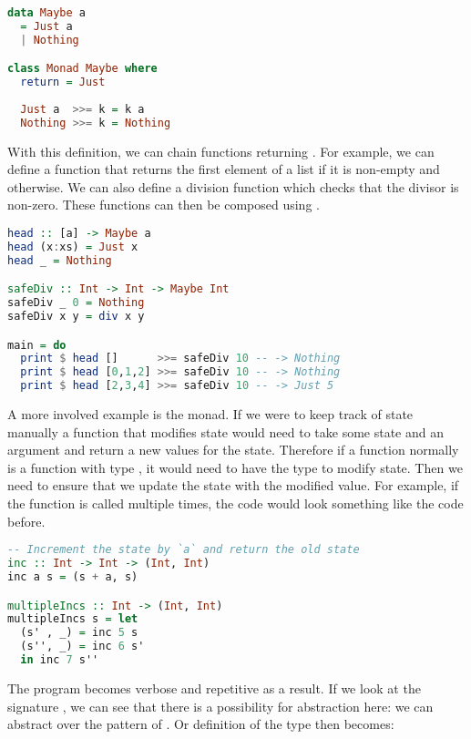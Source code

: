 \begin{lstlisting}[language=haskell,style=fancy]
data Maybe a
  = Just a
  | Nothing

class Monad Maybe where
  return = Just
  
  Just a  >>= k = k a
  Nothing >>= k = Nothing
\end{lstlisting}

With this definition, we can chain functions returning . For example, we can define a  function that returns the first element of a list if it is non-empty and  otherwise. We can also define a division function which checks that the divisor is non-zero. These functions can then be composed using \hs{>>=}.

\begin{lstlisting}[language=haskell,style=fancy]
head :: [a] -> Maybe a
head (x:xs) = Just x
head _ = Nothing

safeDiv :: Int -> Int -> Maybe Int
safeDiv _ 0 = Nothing
safeDiv x y = div x y

main = do
  print $ head []      >>= safeDiv 10 -- -> Nothing
  print $ head [0,1,2] >>= safeDiv 10 -- -> Nothing
  print $ head [2,3,4] >>= safeDiv 10 -- -> Just 5
\end{lstlisting}

A more involved example is the  monad. If we were to keep track of state manually a function that modifies state would need to take some state  and an argument and return a new values for the state. Therefore if a function  normally is a function with type , it would need to have the type  to modify state. Then we need to ensure that we update the state with the modified value. For example, if the function is called multiple times, the code would look something like the code before.

\begin{lstlisting}[language=haskell,style=fancy]
-- Increment the state by `a` and return the old state
inc :: Int -> Int -> (Int, Int)
inc a s = (s + a, s)

multipleIncs :: Int -> (Int, Int)
multipleIncs s = let
  (s' , _) = inc 5 s
  (s'', _) = inc 6 s'
  in inc 7 s''
\end{lstlisting}

The program becomes verbose and repetitive as a result. If we look at the signature , we can see that there is a possibility for abstraction here: we can abstract over the pattern of . Or definition of the  type then becomes:

